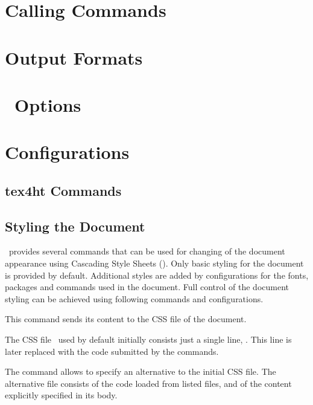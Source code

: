 \documentclass{book}
\begin{document}
\chapter{Calling Commands}

\label{sec:calling-commands}
\chapter{Output Formats}
\chapter{\texfourht\ Options}



\chapter{Configurations}

\section{tex4ht Commands}

\section{Styling the Document}

\texfourht\ provides several commands that can be used for changing of the
document appearance using Cascading Style Sheets (\css). Only basic styling for
the document is provided by default. Additional styles are added by configurations for the
fonts, packages and commands used in the document. Full control of the document
styling can be achieved using following commands and configurations.



This command sends its content to the CSS file of the document. 


The CSS file \texfourht\ used by default initially consists just
a single line,  . This line is later
replaced with the code submitted by the  commands.

The \texcommand{\CssFile} command allows to specify an alternative to the initial CSS file.
The alternative file consists of the code loaded from listed files, and of the
content explicitly specified in its body.
\end{document}
